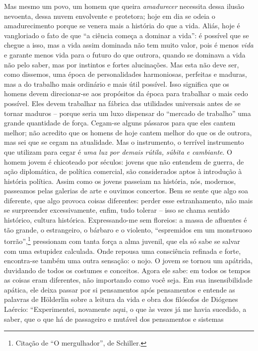 Mas mesmo um povo, um homem que queira \emph{amadurecer} necessita dessa
ilusão nevoenta, dessa nuvem envolvente e protetora; hoje em dia se
odeia o amadurecimento porque se venera mais a história do que a vida.
Aliás, hoje é vangloriado o fato de que ``a ciência começa a dominar a
vida'': é possível que se chegue a isso, mas a vida assim dominada não
tem muito valor, pois é menos \emph{vida} e garante menos vida para o
futuro do que outrora, quando se dominava a vida não pelo saber, mas por
instintos e fortes alucinações. Mas esta não deve ser, como dissemos,
uma época de personalidades harmoniosas, perfeitas e maduras, mas a do
trabalho mais ordinário e mais útil possível. Isso significa que os
homens devem direcionar-se aos propósitos da época para trabalhar o mais
cedo possível. Eles devem trabalhar na fábrica das utilidades universais
antes de se tornar maduros -- porque seria um luxo dispensar do
``mercado de trabalho'' uma grande quantidade de força. Cegam-se alguns
pássaros para que eles cantem melhor; não acredito que os homens de hoje
cantem melhor do que os de outrora, mas sei que se cegam na atualidade.
Mas o instrumento, o terrível instrumento que utilizam para cegar é
\emph{uma luz por demais rútila, súbita e cambiante}. O homem jovem é
chicoteado por séculos: jovens que não entendem de guerra, de ação
diplomática, de política comercial, são considerados aptos à introdução
à história política. Assim como os jovens passeiam na história, nós,
modernos, passeamos pelas galerias de arte e ouvimos concertos. Bem se
sente que algo soa diferente, que algo provoca coisas diferentes: perder
esse estranhamento, não mais se surpreender excessivamente, enfim, tudo
tolerar -- isso se chama sentido histórico, cultura histórica.
Expressando-me sem floreios: a massa de afluentes é tão grande, o
estrangeiro, o bárbaro e o violento, ``espremidos em um monstruoso
torrão'',\footnote{Citação de ``O mergulhador'', de Schiller.} 
pressionam com tanta força a alma juvenil, que ela só sabe se salvar com
uma estupidez calculada. Onde repousa uma consciência refinada e forte,
encontra-se também uma outra sensação: o nojo. O jovem se tornou um
apátrida, duvidando de todos os costumes e conceitos. Agora ele sabe: em
todos os tempos as coisas eram diferentes, não importando como você
seja. Em sua insensibilidade apática, ele deixa passar por si
pensamentos após pensamentos e entende as palavras de Hölderlin sobre a
leitura da vida e obra dos filósofos de Diógenes Laércio:
``Experimentei, novamente aqui, o que às vezes já me havia sucedido, a
saber, que o que há de passageiro e mutável dos pensamentos e sistemas
